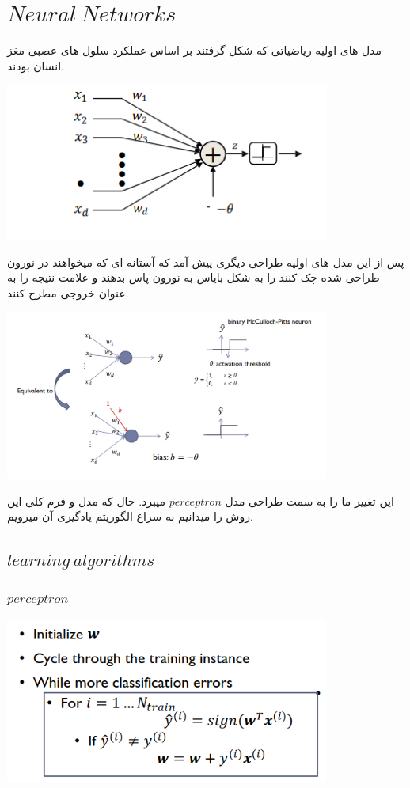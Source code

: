 \documentclass[12pt]{article}
\begin{document}
\fontsize{12pt}{14pt}\selectfont




\section*{$Neural\:Networks$}
مدل های اولیه ریاضیاتی که شکل گرفتند بر اساس عملکرد سلول های عصبی مغز انسان بودند.

\includegraphics[width= 0.8\textwidth]{figs/model1.png}

پس از این مدل های اولیه طراحی دیگری پیش آمد که آستانه ای که میخواهند در نورون طراحی شده چک کنند را به شکل بایاس به نورون پاس بدهند و علامت نتیجه را به عنوان خروجی مطرح کنند.

\includegraphics[width= 0.8\textwidth]{figs/model2.png}


این تغییر ما را به سمت طراحی مدل 
$perceptron$
میبرد. حال که مدل و فرم کلی این روش را میدانیم به سراغ الگوریتم یادگیری آن میرویم.
\subsection*{$learning\:algorithms$}
\subsubsection*{$perceptron$}

\includegraphics[width= 0.8\textwidth]{figs/perceptrion_la.png}
\end{document}
